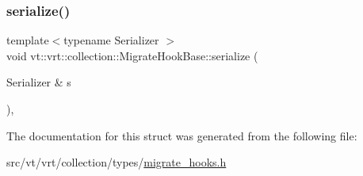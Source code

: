 \subsubsection{\texorpdfstring{serialize()}{serialize()}}
{\footnotesize\ttfamily template$<$typename Serializer $>$ \\
void vt\+::vrt\+::collection\+::\+Migrate\+Hook\+Base\+::serialize (\begin{DoxyParamCaption}\item[{Serializer \&}]{s }\end{DoxyParamCaption})\hspace{0.3cm}{\ttfamily [inline]}, {\ttfamily [protected]}}



The documentation for this struct was generated from the following file\+:\begin{DoxyCompactItemize}
\item 
src/vt/vrt/collection/types/\hyperlink{migrate__hooks_8h}{migrate\+\_\+hooks.\+h}\end{DoxyCompactItemize}

